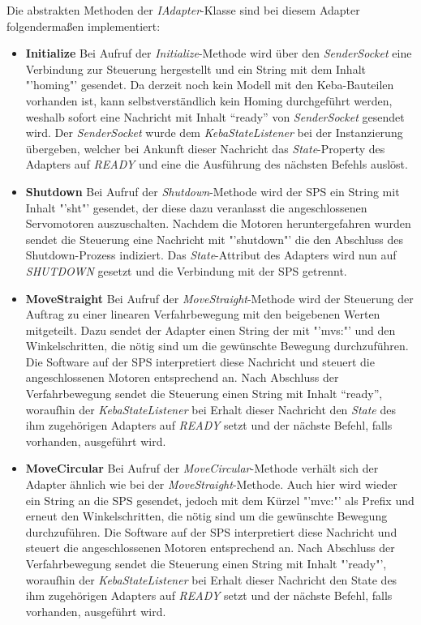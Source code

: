 Die abstrakten Methoden der \textit{IAdapter}-Klasse sind bei diesem Adapter folgendermaßen implementiert:
\begin{itemize}
\item \textbf{Initialize}
\newline
Bei Aufruf der \textit{Initialize}-Methode wird über den \textit{SenderSocket} eine Verbindung zur Steuerung hergestellt und ein String mit dem Inhalt "'homing"' gesendet. Da derzeit noch kein Modell mit den Keba-Bauteilen vorhanden ist, kann selbstverständlich kein Homing durchgeführt werden, weshalb sofort eine Nachricht mit Inhalt “ready” von \textit{SenderSocket} gesendet wird. Der \textit{SenderSocket} wurde dem \textit{KebaStateListener} bei der Instanzierung übergeben, welcher bei Ankunft dieser Nachricht das \textit{State}-Property des Adapters auf \textit{READY} und eine die Ausführung des nächsten Befehls auslöst.
\item \textbf{Shutdown}
\newline
Bei Aufruf der \textit{Shutdown}-Methode wird der SPS ein String mit Inhalt "'sht"' gesendet, der diese dazu veranlasst die angeschlossenen Servomotoren auszuschalten. Nachdem die Motoren heruntergefahren wurden sendet die Steuerung eine Nachricht mit "'shutdown"' die den Abschluss des Shutdown-Prozess indiziert. Das \textit{State}-Attribut des Adapters wird nun auf \textit{SHUTDOWN} gesetzt und die Verbindung mit der SPS getrennt.
\item \textbf{MoveStraight}
\newline
Bei Aufruf der \textit{MoveStraight}-Methode wird der Steuerung der Auftrag zu einer linearen Verfahrbewegung mit den beigebenen Werten mitgeteilt. Dazu sendet der Adapter einen String der mit "'mvs:"' und den Winkelschritten, die nötig sind um die gewünschte Bewegung durchzuführen. Die Software auf der SPS interpretiert diese Nachricht und steuert die angeschlossenen Motoren entsprechend an. Nach Abschluss der Verfahrbewegung sendet die Steuerung einen String mit Inhalt “ready”, woraufhin der \textit{KebaStateListener} bei Erhalt dieser Nachricht den \textit{State} des ihm zugehörigen Adapters auf \textit{READY} setzt und der nächste Befehl, falls vorhanden, ausgeführt wird.
\item \textbf{MoveCircular}
\newline
Bei Aufruf der \textit{MoveCircular}-Methode verhält sich der Adapter ähnlich wie bei der \textit{MoveStraight}-Methode. Auch hier wird wieder ein String an die SPS gesendet, jedoch mit dem Kürzel "'mvc:"' als Prefix und erneut den Winkelschritten, die nötig sind um die gewünschte Bewegung durchzuführen. Die Software auf der SPS interpretiert diese Nachricht und steuert die angeschlossenen Motoren entsprechend an.  Nach Abschluss der Verfahrbewegung sendet die Steuerung einen String mit Inhalt "'ready"', woraufhin der \textit{KebaStateListener} bei Erhalt dieser Nachricht den State des ihm zugehörigen Adapters auf \textit{READY} setzt und der nächste Befehl, falls vorhanden, ausgeführt wird.

\end{itemize}
